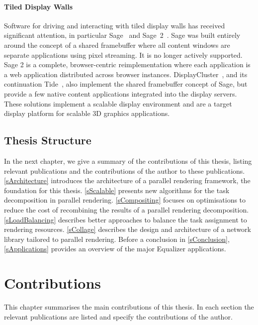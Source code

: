 \subsubsection{Tiled Display Walls}

Software for driving and interacting with tiled display walls has received
significant attention, in particular {Sage}~\cite{Sage} and
 {Sage~2}~\cite{Sage2}. {Sage} was built entirely
around the concept of a shared framebuffer where all content windows are
separate applications using pixel streaming. It is no longer actively supported.
{Sage 2} is a complete, browser-centric reimplementation where each
application is a web application distributed across browser instances.
{DisplayCluster}~\cite{DisplayCluster}, and its continuation
 {Tide}~\cite{tide}, also implement the shared framebuffer concept of
 {Sage}, but provide a few native content applications integrated into the
display servers. These solutions implement a scalable display environment and
are a target display platform for scalable 3D graphics applications.

\section{Thesis Structure}

In the next chapter, we
give a summary of the contributions of this thesis, listing relevant
publications and the contributions of the author to these publications.
\cref{sArchitecture} introduces the architecture of a parallel rendering
framework, the foundation for this thesis. \cref{sScalable} presents new
algorithms for the task decomposition in parallel rendering.
\cref{sCompositing} focuses on optimisations to reduce the cost of recombining
the results of a parallel rendering decomposition. \cref{sLoadBalancing}
describes better approaches to balance the task assignment to rendering
resources. \cref{sCollage} describes the design and architecture of a network
library tailored to parallel rendering. Before a conclusion in
\cref{sConclusion}, \cref{sApplications} provides an overview of the major
Equalizer applications.


\chapter{Contributions}

This chapter summarises the main contributions of this thesis. In each section
the relevant publications are listed and specify the contributions of the author.

